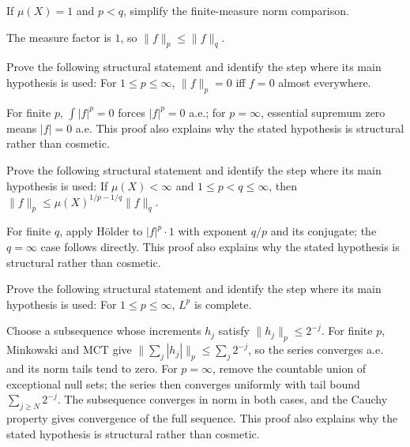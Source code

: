 \begin{problem}\label{prob:iii06-problem-08}
If \(\mu(X)=1\) and \(p<q\), simplify the finite-measure norm comparison.
\end{problem}
\begin{solution}
The measure factor is \(1\), so \(\|f\|_p\le\|f\|_q\).
\end{solution}

\begin{problem}\label{prob:iii06-problem-09}
Prove the following structural statement and identify the step where its main hypothesis is used: For $1\le p\le\infty$, $\|f\|_p=0$ iff $f=0$ almost everywhere.
\end{problem}
\begin{solution}
For finite $p$, $\int|f|^p=0$ forces $|f|^p=0$ a.e.; for $p=\infty$, essential supremum zero means $|f|=0$ a.e. This proof also explains why the stated hypothesis is structural rather than cosmetic.
\end{solution}

\begin{problem}\label{prob:iii06-problem-10}
Prove the following structural statement and identify the step where its main hypothesis is used: If $\mu(X)<\infty$ and $1\le p<q\le\infty$, then $\|f\|_p\le\mu(X)^{1/p-1/q}\|f\|_q$.
\end{problem}
\begin{solution}
For finite $q$, apply Hölder to $|f|^p\cdot1$ with exponent $q/p$ and its conjugate; the $q=\infty$ case follows directly. This proof also explains why the stated hypothesis is structural rather than cosmetic.
\end{solution}

\begin{problem}[Completeness of $L^p$]\label{prob:iii06-problem-11}
Prove the following structural statement and identify the step where its main hypothesis is used: For $1\le p\le\infty$, $L^p$ is complete.
\end{problem}
\begin{solution}
Choose a subsequence whose increments $h_j$ satisfy $\|h_j\|_p\le2^{-j}$. For finite $p$, Minkowski and MCT give $\|\sum_j|h_j|\|_p\le\sum_j2^{-j}$, so the series converges a.e. and its norm tails tend to zero. For $p=\infty$, remove the countable union of exceptional null sets; the series then converges uniformly with tail bound $\sum_{j\ge N}2^{-j}$. The subsequence converges in norm in both cases, and the Cauchy property gives convergence of the full sequence. This proof also explains why the stated hypothesis is structural rather than cosmetic.
\end{solution}

